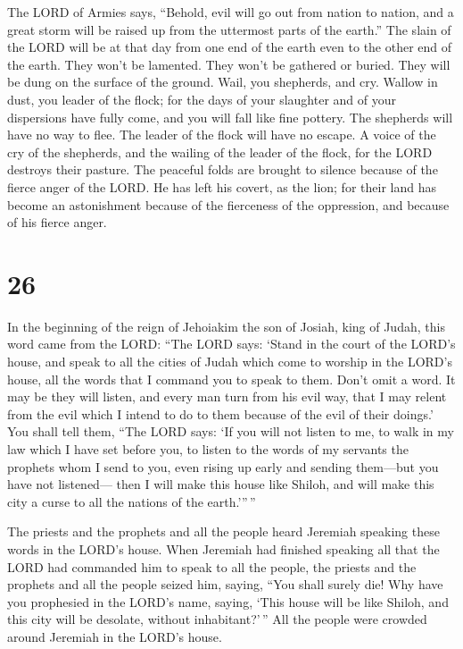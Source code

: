  The LORD of Armies says, ``Behold, evil will go out from
nation to nation, and a great storm will be raised up from the uttermost
parts of the earth.''  The slain of the LORD will be at
that day from one end of the earth even to the other end of the earth.
They won't be lamented. They won't be gathered or buried. They will be
dung on the surface of the ground.  Wail, you shepherds,
and cry. Wallow in dust, you leader of the flock; for the days of your
slaughter and of your dispersions have fully come, and you will fall
like fine pottery.  The shepherds will have no way to flee.
The leader of the flock will have no escape.  A voice of
the cry of the shepherds, and the wailing of the leader of the flock,
for the LORD destroys their pasture.  The peaceful folds
are brought to silence because of the fierce anger of the LORD.
 He has left his covert, as the lion; for their land has
become an astonishment because of the fierceness of the oppression, and
because of his fierce anger.

\hypertarget{section-25}{%
\section{26}\label{section-25}}

 In the beginning of the reign of Jehoiakim the son of
Josiah, king of Judah, this word came from the LORD:  ``The
LORD says: `Stand in the court of the LORD's house, and speak to all the
cities of Judah which come to worship in the LORD's house, all the words
that I command you to speak to them. Don't omit a word.  It
may be they will listen, and every man turn from his evil way, that I
may relent from the evil which I intend to do to them because of the
evil of their doings.'  You shall tell them, ``The LORD
says: `If you will not listen to me, to walk in my law which I have set
before you,  to listen to the words of my servants the
prophets whom I send to you, even rising up early and sending them---but
you have not listened---  then I will make this house like
Shiloh, and will make this city a curse to all the nations of the
earth.'''\,''

 The priests and the prophets and all the people heard
Jeremiah speaking these words in the LORD's house.  When
Jeremiah had finished speaking all that the LORD had commanded him to
speak to all the people, the priests and the prophets and all the people
seized him, saying, ``You shall surely die!  Why have you
prophesied in the LORD's name, saying, `This house will be like Shiloh,
and this city will be desolate, without inhabitant?'\,'' All the people
were crowded around Jeremiah in the LORD's house.

